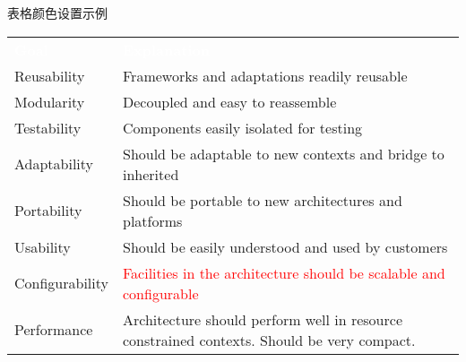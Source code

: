 \documentclass[UTF8]{ctexart}
\begin{document}
  \Large 表格颜色设置示例\normalsize

  \vspace{4ex}
  
  \begin{tabular}{p{26mm}!{\color{white}\vrule width 3pt}p{112mm}}
    \textcolor{white}{\textbf{Goal}} & \textcolor{white}{\textbf{Explanation}}\\
    Reusability & Frameworks and adaptations readily reusable\\
    Modularity & Decoupled and easy to reassemble\\
    Testability & Components easily isolated for testing\\
    Adaptability & Should be adaptable to new contexts and  bridge to inherited\\
    Portability & Should be portable to new architectures and platforms\\
    Usability & Should be easily understood and used by customers\\
    Configurability & \textcolor{red}{Facilities in the architecture should be scalable and configurable}\\
    Performance & Architecture should perform well in resource constrained contexts. Should be very compact.
  \end{tabular}
\end{document}
